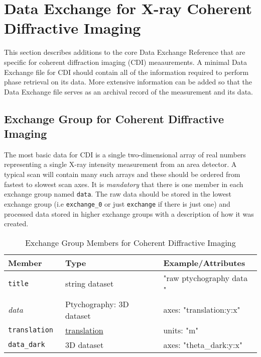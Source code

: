 \section{Data Exchange for X-ray Coherent Diffractive Imaging}
\label{exchange:cdi}

This section describes additions to the core Data Exchange Reference that are specific for coherent diffraction imaging (CDI) meaaurements. A minimal Data Exchange file for CDI should contain all of the information required to perform phase retrieval on its data. More extensive information can be added so that the Data Exchange file serves as an archival record of the measurement and its data.

\subsection{Exchange Group for Coherent Diffractive Imaging}
The most basic data for CDI is a single two-dimensional array of real numbers representing a single X-ray intensity measurement from an area detector. A typical scan will contain many such arrays and these should be ordered from fastest to slowest scan axes.
It is \emph{mandatory} that there is one member in each exchange group named {\tt{data}}. The raw data should be stored in the lowest exchange group (i.e {\tt{exchange\_0}} or just {\tt{exchange}} if there is just one) and processed data stored in higher exchange groups with a description of how it was created.
\begin{table}[h!]\sffamily \footnotesize
\caption{Exchange Group Members for Coherent Diffractive Imaging}
\centering
{}
\begin{tabular}{l l l}
\toprule
\bfseries Member     & \bfseries Type & \bfseries Example/Attributes \\
\midrule
\tt{title}  & string dataset & "raw ptychography data   " \\
\emph{data}  & Ptychography: 3D dataset & axes: "translation:y:x"  \\
\tt{translation} & \hyperref[table:translation]{translation} & units: "m" \\
\tt{data\_dark} & 3D dataset & axes: "theta\_dark:y:x" \\
\bottomrule
\end{tabular}
\end{table}

